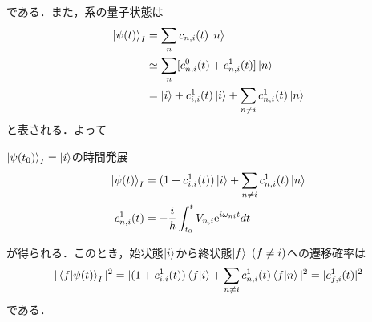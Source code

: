\documentclass{report}
\begin{document}
  である．また，系の量子状態は
  \begin{align}
    \ket{\psi(t)}_I&=\sum_{n}c_{n,i}(t)\ket{n}\\
    &\simeq\sum_{n}[c_{n,i}^0(t)+c_{n,i}^1(t)]\ket{n}\\
    &=\ket{i}+c_{i,i}^1(t)\ket{i}+\sum_{n\ne i}c_{n,i}^1(t)\ket{n}
  \end{align}
  と表される．よって
  \begin{itembox}[l]{$\ket{\psi(t_0)}_I=\ket{i}$の時間発展}
    \begin{align}
      \ket{\psi(t)}_I&=(1+c_{i,i}^1(t))\ket{i}+\sum_{n\ne i}c_{n,i}^1(t)\ket{n}\\
      c_{n,i}^1(t)&=-\frac{i}{\hbar}\int_{t_0}^{t}V_{n,i}\mathrm{e}^{i\omega_{ni}t}dt
    \end{align}
  \end{itembox}
  が得られる．このとき，始状態$\ket{i}$から終状態$\ket{f}\ (f\ne i)$への遷移確率は
  \begin{equation}
    |\braket{f}{\psi(t)}_I|^2=|(1+c_{i,i}^1(t))\braket{f}{i}+\sum_{n\ne i}c_{n,i}^1(t)\braket{f}{n}|^2=|c_{f,i}^1(t)|^2
  \end{equation}
  である．
\end{document}
